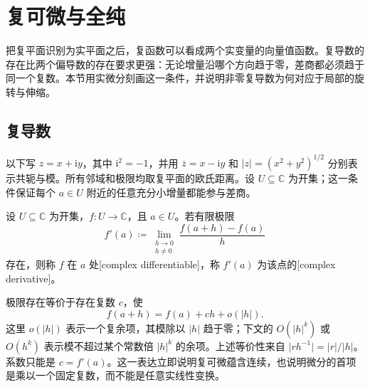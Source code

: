 \section{复可微与全纯}
\label{b3:sec:0101}


把复平面识别为实平面之后，复函数可以看成两个实变量的向量值函数。复导数的存在比两个偏导数的存在要求更强：无论增量沿哪个方向趋于零，差商都必须趋于同一个复数。本节用实微分刻画这一条件，并说明非零复导数为何对应于局部的旋转与伸缩。

\subsection{复导数}
\label{b3:subsec:010101}

以下写 \(z=x+\mathrm{i}y\)，其中 \(\mathrm{i}^2=-1\)，并用 \(\overline z=x-\mathrm{i}y\) 和 \(\lvert z\rvert=(x^2+y^2)^{1/2}\) 分别表示共轭与模。所有邻域和极限均取复平面的欧氏距离。设 \(U\subseteq\mathbb C\) 为开集；这一条件保证每个 \(a\in U\) 附近的任意充分小增量都能参与差商。

\begin{definition}\label{b3:def:01-complex-derivative}
设 \(U\subseteq\mathbb C\) 为开集，\(f:U\rightarrow\mathbb C\)，且 \(a\in U\)。若有限极限
\[
 f'(a)\coloneqq\lim_{\substack{h\to0\\h\ne0}}
 \frac{f(a+h)-f(a)}{h}
\]
存在，则称 \(f\) 在 \(a\) 处[complex differentiable]，称 \(f'(a)\) 为该点的[complex derivative]。
\end{definition}

极限存在等价于存在复数 \(c\)，使
\begin{equation}\label{b3:eq:01-complex-linear-approximation}
 f(a+h)=f(a)+ch+o(\lvert h\rvert).
\end{equation}
这里 \(o(\lvert h\rvert)\) 表示一个复余项，其模除以 \(\lvert h\rvert\) 趋于零；下文的 \(O(|h|^k)\) 或 \(O(h^k)\) 表示模不超过某个常数倍 \(|h|^k\) 的余项。上述等价性来自 \(\lvert rh^{-1}\rvert=\lvert r\rvert/\lvert h\rvert\)。系数只能是 \(c=f'(a)\)。这一表达立即说明复可微蕴含连续，也说明微分的首项是乘以一个固定复数，而不能是任意实线性变换。

